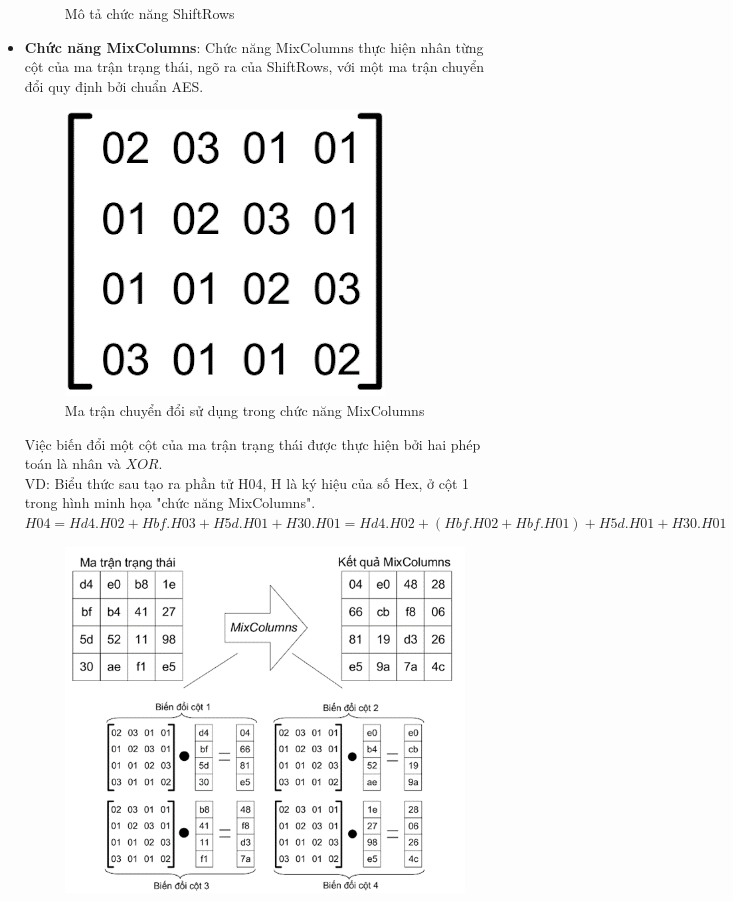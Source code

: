 \begin{itemize}
\begin{figure}[H]
        \caption{Mô tả chức năng ShiftRows}
    \end{figure}
    \item \textbf{Chức năng MixColumns}: Chức năng MixColumns thực hiện nhân từng cột của ma trận trạng thái, ngõ ra của ShiftRows, với một ma trận chuyển đổi quy định bởi chuẩn AES.
    \begin{figure}[H]
        \centering
        \includegraphics{Ảnh/hiền/mix.png}
        \caption{Ma trận chuyển đổi sử dụng trong chức năng MixColumns}
    \end{figure}
    Việc biến đổi một cột của ma trận trạng thái được thực hiện bởi hai phép toán là nhân và $XOR$.\\
    VD: Biểu thức sau tạo ra phần tử H04, H là ký hiệu của số Hex, ở cột 1 trong hình minh họa "chức năng MixColumns".\\
    $H04 =Hd4.H02 + Hbf.H03 + H5d.H01 + H30.H01=Hd4.H02 + (Hbf.H02 + Hbf.H01) + H5d.H01 + H30.H01$ 
    \begin{figure}[H]
        \centering
        \includegraphics{Ảnh/hiền/vd mix.png}

\end{figure}
\end{itemize}
